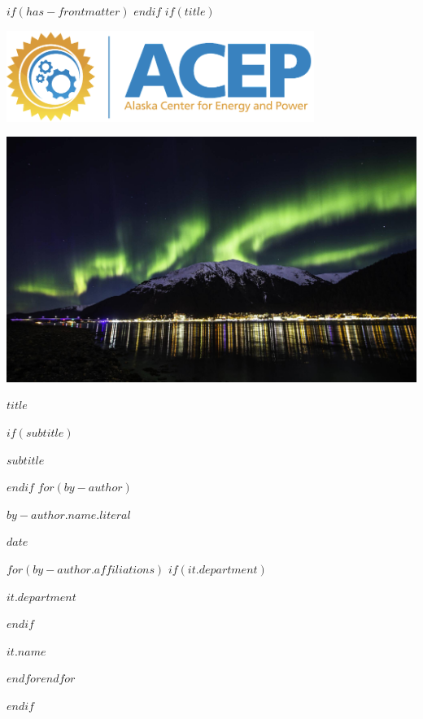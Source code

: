 $if(has-frontmatter)$
\frontmatter
$endif$
$if(title)$
\cleardoublepage
\thispagestyle{empty}
{\centering
\par\noindent\includegraphics[width=0.75\textwidth]{images/ACEP_logo.png}
\vspace{3ex}
\par\noindent\includegraphics[width=\textwidth]{images/jnu_aurora.jpeg}
\vspace{3ex}
{\huge\bfseries $title$ \par}
$if(subtitle)$
{\Large $subtitle$ \par}
$endif$
\vspace{3ex}
$for(by-author)$
{\Large $by-author.name.literal$ \par}
\vspace{3ex}
{\bfseries\large $date$ \par}
\vspace{12ex}
$for(by-author.affiliations)$%
$if(it.department)$%
{\bfseries\large $it.department$ \par}
\vspace{3ex}
$endif$%
{\bfseries\large $it.name$ \par}
$endfor$$endfor$%
}
$endif$
